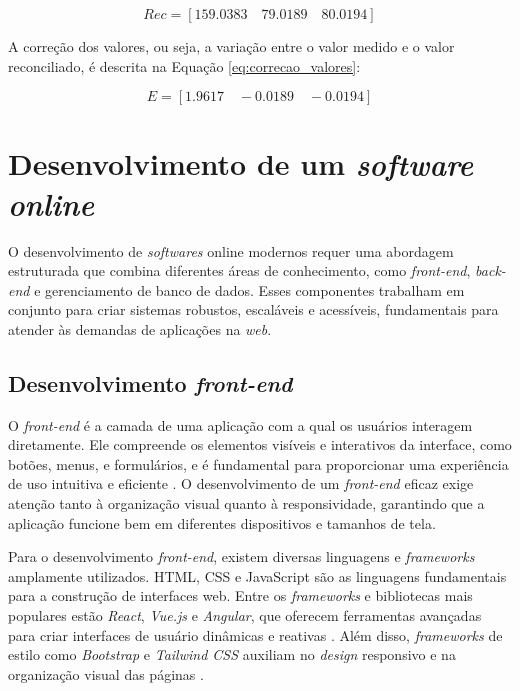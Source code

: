 \begin{equation}
    Rec = [159.0383 \quad 79.0189 \quad 80.0194]
    \label{eq:medidas_reconciliadas}
\end{equation}

A correção dos valores, ou seja, a variação entre o valor medido e o valor reconciliado, é descrita na Equação \eqref{eq:correcao_valores}:

\begin{equation}
    E = [1.9617 \quad -0.0189 \quad -0.0194 ]
    \label{eq:correcao_valores}
\end{equation}



\section{Desenvolvimento de um \textit{software online}}

O desenvolvimento de \textit{softwares} online modernos requer uma abordagem estruturada que combina diferentes áreas de conhecimento, como \textit{front-end}, \textit{back-end} e gerenciamento de banco de dados. Esses componentes trabalham em conjunto para criar sistemas robustos, escaláveis e acessíveis, fundamentais para atender às demandas de aplicações na \textit{web}.

\subsection{Desenvolvimento \textit{front-end}}

O \textit{front-end} é a camada de uma aplicação com a qual os usuários interagem diretamente. Ele compreende os elementos visíveis e interativos da interface, como botões, menus, e formulários, e é fundamental para proporcionar uma experiência de uso intuitiva e eficiente \cite{frontendrole}. O desenvolvimento de um \textit{front-end} eficaz exige atenção tanto à organização visual quanto à responsividade, garantindo que a aplicação funcione bem em diferentes dispositivos e tamanhos de tela.

Para o desenvolvimento \textit{front-end}, existem diversas linguagens e \textit{frameworks} amplamente utilizados. HTML, CSS e JavaScript são as linguagens fundamentais para a construção de interfaces web. Entre os \textit{frameworks} e bibliotecas mais populares estão \textit{React}, \textit{Vue.js} e \textit{Angular}, que oferecem ferramentas avançadas para criar interfaces de usuário dinâmicas e reativas \cite{reactbook}. Além disso, \textit{frameworks} de estilo como \textit{Bootstrap} e \textit{Tailwind CSS} auxiliam no \textit{design} responsivo e na organização visual das páginas \cite{bootstrapdoc}.

